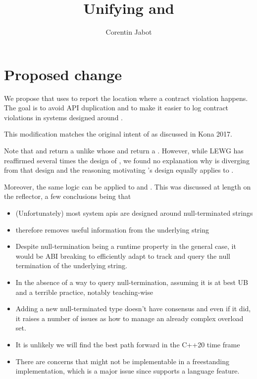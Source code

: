 \documentclass{wg21}
\title{Unifying \tcode{source\_location} and \tcode{contract\_violation}}
\author{Corentin Jabot}{corentin.jabot@gmail.com}
\begin{document}
\maketitle

\section{Proposed change}

We propose that  uses 
to report the location where a contract violation happens.
The goal is to avoid API duplication and to make it easier to log contract violations
in systems designed around  .

This modification matches the original intent of \cite{P0542} as discussed in Kona 2017.


Note that  and 
return a  unlike  whose 
and  return a .
However, while LEWG has reaffirmed several times the design of ,
we found no explanation why  is diverging from that design and
the reasoning motivating 's design equally applies  to .

Moreover, the same logic can be applied to  and .
This was discussed at length on the reflector, a few conclusions being that

\begin{itemize}
	\item (Unfortunately) most system apis are designed around null-terminated strings
	\item {} therefore removes useful information from the underlying string
	\item Despite null-termination being a runtime property in the general case, it would be ABI breaking to efficiently adapt  to track and query the null termination of the underlying string.
	\item In the absence of a way to query null-termination, assuming it is at best UB and a terrible practice, notably teaching-wise
	\item Adding a new null-terminated  type doesn't have consensus and even if it did, it raises a number of issues as how to manage an already complex overload set.
	\item It is unlikely we will find the best path forward in the C++20 time frame
	\item There are concerns that  might not be implementable in a freestanding implementation, which is a major issue since  supports a language feature.
\end{itemize}
\end{document}
